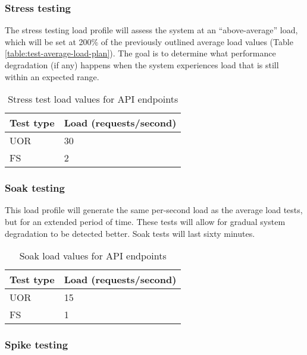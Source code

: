 \subsubsection{Stress testing}

The stress testing load profile will assess the system at an ``above-average'' load, which will be set at 200\% of the previously outlined average load values (Table \ref{table:test-average-load-plan}). The goal is to determine what performance degradation (if any) happens when the system experiences load that is still within an expected range.

\begin{table}[h]
    \centering
    \begin{tabularx}{\textwidth}{|X|X|}
        \hline
        \textbf{Test type} & \textbf{Load (requests/second)}  \\ \hline
        UOR & 30 \\ \hline
        FS & 2 \\ \hline
    \end{tabularx}
    \caption{Stress test load values for API endpoints}
    \label{table:test-stress-load-plan}
\end{table}

\subsubsection{Soak testing}

This load profile will generate the same per-second load as the average load tests, but for an extended period of time. These tests will allow for gradual system degradation to be detected better. Soak tests will last sixty minutes.

\begin{table}[h]
    \centering
    \begin{tabularx}{\textwidth}{|X|X|}
        \hline
        \textbf{Test type} & \textbf{Load (requests/second)}  \\ \hline
        UOR & 15 \\ \hline
        FS & 1 \\ \hline
    \end{tabularx}
    \caption{Soak load values for API endpoints}
    \label{table:test-soak-load-plan}
\end{table}

\subsubsection{Spike testing}

